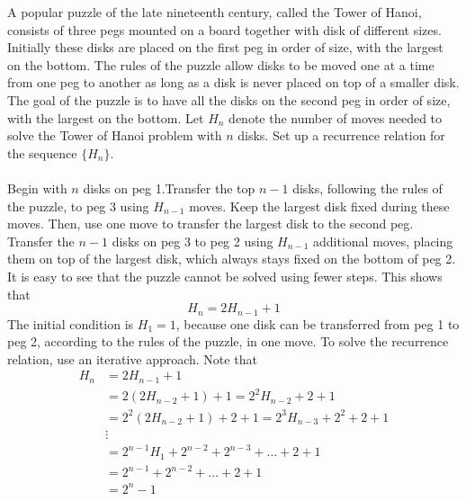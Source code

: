 \documentclass[12pt]{article}
\begin{document}
\begin{example} A popular puzzle of the late nineteenth century, called the Tower of Hanoi, consists of three pegs mounted on a board together with disk of different sizes. Initially these disks are placed on the first peg in order of size, with the largest on the bottom. The rules of the puzzle allow disks to be moved one at a time from one peg to another as long as a disk is never placed on top of a smaller disk. The goal of the puzzle is to have all the disks on the second peg in order of size, with the largest on the bottom. Let $H_n$ denote the number of moves needed to solve the Tower of Hanoi problem with $n$ disks. Set up a recurrence relation for the sequence $\{H_n\}$. \\~\\ 
Begin with $n$ disks on peg 1.Transfer the top $n - 1$ disks, following the rules of the puzzle, to peg 3 using $H_{n - 1}$ moves. Keep the largest disk fixed during these moves. Then, use one move to transfer the largest disk to the second peg. Transfer the $n - 1$ disks on peg 3 to peg 2 using $H_{n - 1}$ additional moves, placing them on top of the largest disk, which always stays fixed on the bottom of peg 2. It is easy to see that the puzzle cannot be solved using fewer steps. This shows that $$H_n = 2H_{n - 1} + 1$$ 
The initial condition is $H_1 = 1$, because one disk can be transferred from peg 1 to peg 2, according to the rules of the puzzle, in one move. To solve the recurrence relation, use an iterative approach. Note that $$\begin{aligned} H_n &= 2H_{n - 1} + 1 \\ &= 2(2H_{n - 2} + 1) + 1 = 2^2 H_{n - 2} + 2 + 1 \\ &= 2^2(2H_{n - 2} + 1) + 2 + 1 = 2^3H_{n - 3} + 2^2 + 2 + 1 \\ &\vdots \\ &= 2^{n - 1}H_1 + 2^{n - 2} + 2^{n - 3} + \dots + 2 + 1 \\ &= 2^{n - 1} + 2^{n - 2} + \dots + 2 + 1 \\ &= 2^n - 1 \end{aligned} $$ 

\end{example}
\end{document}
